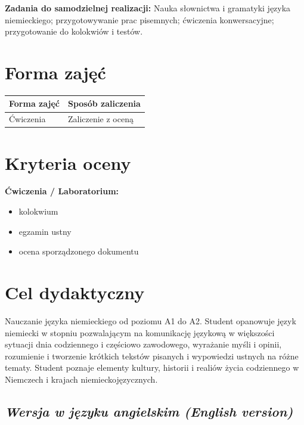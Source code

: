 \documentclass[12pt, a4paper]{article}
\newcommand{\thdrule}{\noalign{\global\setlength{\extrarowheight}{0pt}}}
\newcommand{\thdend}{\noalign{\global\setlength{\extrarowheight}{3pt}}}
\begin{document}
\vspace{4pt}
\noindent\textbf{Zadania do samodzielnej realizacji:} Nauka słownictwa i gramatyki języka niemieckiego; przygotowywanie prac pisemnych; ćwiczenia konwersacyjne; przygotowanie do kolokwiów i testów.

\section{Forma zajęć}

\begin{center}
{\scriptsize
\begin{tabular}{m{5cm}m{8cm}}
\thdrule\toprule
\rowcolor{pjatkRed} {\color{white}\textbf{Forma zajęć}} & {\color{white}\textbf{Sposób zaliczenia}} \\
\midrule\thdend
  \rowcolor{tableRowLight} Ćwiczenia & Zaliczenie z oceną \\
\bottomrule
\end{tabular}}
\end{center}

\section{Kryteria oceny}

\textbf{Ćwiczenia / Laboratorium:}
\begin{itemize}
  \item kolokwium
  \item egzamin ustny
  \item ocena sporządzonego dokumentu
\end{itemize}


\section{Cel dydaktyczny}

Nauczanie języka niemieckiego od poziomu A1 do A2. Student  opanowuje język niemiecki w stopniu pozwalającym na komunikację językową w większości sytuacji dnia codziennego i częściowo zawodowego, wyrażanie myśli i opinii, rozumienie i tworzenie krótkich tekstów pisanych i wypowiedzi ustnych na różne tematy. Student poznaje elementy kultury, historii i realiów życia codziennego w Niemczech i krajach niemieckojęzycznych.

\subsection*{\textit{Wersja w języku angielskim (English version)}}
\end{document}
